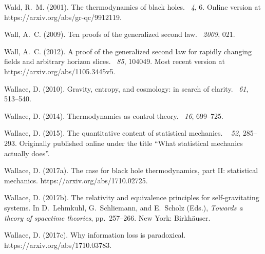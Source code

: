 \documentclass[12pt]{article}
\begin{document}
\begin{thebibliography}{}
Wald, R.~M. (2001).
\newblock The thermodynamics of black holes.
~{\em 4}, 6.
\newblock Online version at https://arxiv.org/abs/gr-qc/9912119.

Wall, A.~C. (2009).
\newblock Ten proofs of the generalized second law.
~{\em 2009}, 021.

Wall, A.~C. (2012).
\newblock A proof of the generalized second law for rapidly changing fields and
  arbitrary horizon slices.
~{\em 85}, 104049.
\newblock Most recent version at https://arxiv.org/abs/1105.3445v5.

Wallace, D. (2010).
\newblock Gravity, entropy, and cosmology: in search of clarity.
~{\em 61},
  513--540.

Wallace, D. (2014).
\newblock Thermodynamics as control theory.
~{\em 16}, 699--725.

Wallace, D. (2015).
\newblock The quantitative content of statistical mechanics.
~{\em
  52}, 285--293.
\newblock Originally published online under the title ``What statistical
  mechanics actually does''.

Wallace, D. (2017a).
\newblock The case for black hole thermodynamics, part {II}: statistical
  mechanics.
\newblock https://arxiv.org/abs/1710.02725.

Wallace, D. (2017b).
\newblock The relativity and equivalence principles for self-gravitating
  systems.
\newblock In D.~Lehmkuhl, G.~Schliemann, and E.~Scholz (Eds.), {\em Towards a
  theory of spacetime theories}, pp.\  257--266. New York: Birkh{\"a}user.

Wallace, D. (2017c).
\newblock Why information loss is paradoxical.
\newblock https://arxiv.org/abs/1710.03783.


\end{thebibliography}
\end{document}
